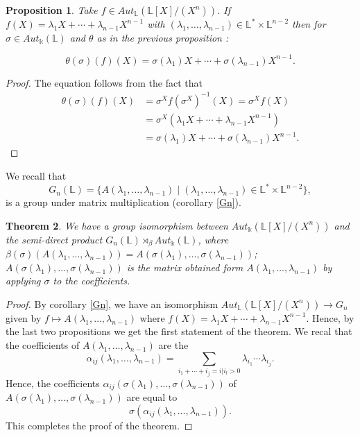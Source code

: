 \documentclass[12pt, reqno]{amsart}
\newtheorem{theorem}{Theorem}[section]
\newtheorem{proposition}[theorem]{Proposition}
\newcommand{\K}{ {\Bbbk} }
\newcommand{\FL}{ {\mathbb L} }
\begin{document}
\begin{proposition}
Take $f\in Aut_\FL(\FL[X]/(X^n))$. If $f(X)= \lambda_1 X + \cdots + \lambda_{n-1} X^{n-1}$ with $(\lambda_1,\dots,\lambda_{n-1}) \in \FL^*\times \FL^{n-2}$ then for $\sigma \in Aut_\K(\FL)$ and $\theta$ as in the previous proposition : 

$$ \theta(\sigma)(f)(X)=\sigma(\lambda_1)X+\cdots+\sigma(\lambda_{n-1}) X^{n-1}.$$
 
\end{proposition}
\begin{proof}
The equation follows from the fact that \begin{align*}\theta(\sigma)(f)(X)&=\sigma^Xf(\sigma^X)^{-1}(X)=\sigma^Xf(X)\\&=\sigma^X(\lambda_1 X + \cdots + \lambda_{n-1} X^{n-1})\\&=\sigma(\lambda_1)X+\cdots+\sigma(\lambda_{n-1}) X^{n-1}.\end{align*}
\end{proof}
We recall that $$G_n(\FL)=\{A(\lambda_1,\dots,\lambda_{n-1}) \mid (\lambda_1,\dots,\lambda_{n-1}) \in \FL^*\times\FL^{n-2}\},$$
is a group under matrix multiplication (corollary \ref{Gn}).
\begin{theorem}
We have a group isomorphism between $Aut_\K(\FL[X]/(X^n))$ and the semi-direct product $G_n(\FL)\rtimes_\beta Aut_\K(\FL)$, where $\beta(\sigma)(A(\lambda_1,\dots,\lambda_{n-1}))=A(\sigma(\lambda_1),\dots,\sigma(\lambda_{n-1}))$; $A(\sigma(\lambda_1),\dots,\sigma(\lambda_{n-1}))$ is the matrix obtained form $A(\lambda_1,\dots,\lambda_{n-1})$ by applying $\sigma$ to the coefficients.
\end{theorem}
\begin{proof}
By corollary \ref{Gn}, we have an isomorphism $ Aut_\FL(\FL[X]/(X^n)) \to G_n$ given by  $f\mapsto A(\lambda_1,\dots,\lambda_{n-1})$ where $f(X)=\lambda_1X+\cdots+ \lambda_{n-1} X^{n-1}$. Hence, by the last two propositions we get the first statement of the theorem. We recal that the coefficients of $A(\lambda_1,\dots,\lambda_{n-1})$ are the 
$$\alpha_{ij}(\lambda_1,\dots,\lambda_{n-1})= \underset{i_1+\cdots+ i_j=i \vert i_l >0}{\sum} \lambda_{i_1}\cdots \lambda_{i_j} .$$
Hence, the coefficients $\alpha_{ij}(\sigma(\lambda_1),\dots,\sigma(\lambda_{n-1}))$ of $A(\sigma(\lambda_1),\dots,\sigma(\lambda_{n-1}))$ are equal to $$\sigma(\alpha_{ij}(\lambda_1,\dots,\lambda_{n-1})).$$ This completes the proof of the theorem.
\end{proof}
\end{document}
